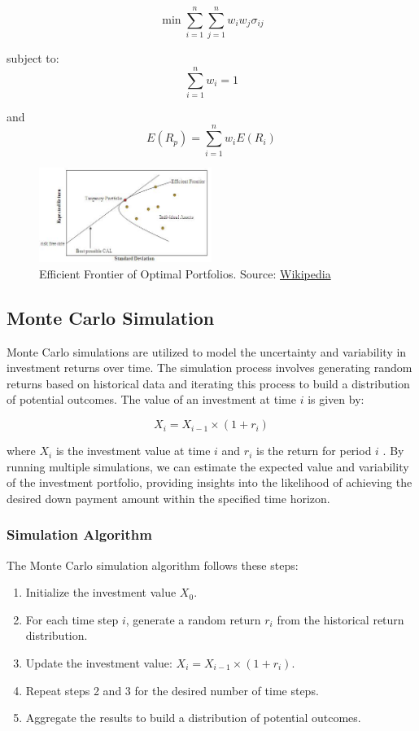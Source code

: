 \[
\min \sum_{i=1}^{n} \sum_{j=1}^{n} w_i w_j \sigma_{ij}
\]

subject to:
\[
\sum_{i=1}^{n} w_i = 1
\]

and
\[
E(R_p) = \sum_{i=1}^{n} w_i E(R_i)
\]

\begin{figure}[h]
\centering
\includegraphics[width=0.5\textwidth]{efficient_frontier.png} 
\caption{Efficient Frontier of Optimal Portfolios. Source: \href{https://en.wikipedia.org/wiki/Efficient_frontier}{Wikipedia}}
\label{fig:efficient_frontier}
\end{figure}

\subsection{Monte Carlo Simulation}
Monte Carlo simulations are utilized to model the uncertainty and variability in investment returns over time. The simulation process involves generating random returns based on historical data and iterating this process to build a distribution of potential outcomes. The value of an investment at time \( i \) is given by:

\[
X_i = X_{i-1} \times (1 + r_i)
\]

where \( X_i \) is the investment value at time \( i \) and \( r_i \) is the return for period \( i \) \citep{boyle1977options}. By running multiple simulations, we can estimate the expected value and variability of the investment portfolio, providing insights into the likelihood of achieving the desired down payment amount within the specified time horizon.

\subsubsection{Simulation Algorithm}
The Monte Carlo simulation algorithm follows these steps:
\begin{enumerate}
    \item Initialize the investment value \( X_0 \).
    \item For each time step \( i \), generate a random return \( r_i \) from the historical return distribution.
    \item Update the investment value: \( X_i = X_{i-1} \times (1 + r_i) \).
    \item Repeat steps 2 and 3 for the desired number of time steps.
    \item Aggregate the results to build a distribution of potential outcomes.
\end{enumerate}

